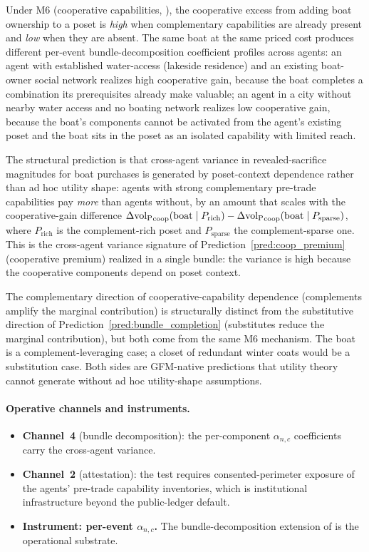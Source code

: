 Under M6 (cooperative capabilities,
\citep[Proposition~1]{lasser2026poset}), the cooperative excess
from adding boat ownership to a poset is \emph{high} when
complementary capabilities are already present and \emph{low}
when they are absent.  The same boat at the same priced cost
produces different per-event bundle-decomposition coefficient
profiles \citep[Definition~4]{lasser2026paper8a} across agents:
an agent with established water-access (lakeside residence) and
an existing boat-owner social network realizes high cooperative
gain, because the boat completes a combination its prerequisites
already make valuable; an agent in a city without nearby water
access and no boating network realizes low cooperative gain,
because the boat's components cannot be activated from the
agent's existing poset and the boat sits in the poset as an
isolated capability with limited reach.

The structural prediction is that cross-agent variance in
revealed-sacrifice magnitudes for boat purchases is generated by
poset-context dependence rather than ad hoc utility shape:
agents with strong complementary pre-trade capabilities pay
\emph{more} than agents without, by an amount that scales with
the cooperative-gain difference
$\Delta{\operatorname{vol}_{\mathrm{P}}}_{\mathrm{coop}}(\mathrm{boat} \mid P_{\mathrm{rich}})
- \Delta{\operatorname{vol}_{\mathrm{P}}}_{\mathrm{coop}}(\mathrm{boat} \mid
P_{\mathrm{sparse}})$, where $P_{\mathrm{rich}}$ is the
complement-rich poset and $P_{\mathrm{sparse}}$ the
complement-sparse one.  This is the cross-agent variance
signature of Prediction~\ref{pred:coop_premium} (cooperative
premium) realized in a single bundle: the variance is high
because the cooperative components depend on poset context.

The complementary direction of cooperative-capability
dependence (complements amplify the marginal contribution) is
structurally distinct from the substitutive direction of
Prediction~\ref{pred:bundle_completion} (substitutes reduce the
marginal contribution), but both come from the same M6
mechanism.  The boat is a complement-leveraging case; a closet
of redundant winter coats would be a substitution case.  Both
sides are GFM-native predictions that utility theory cannot
generate without ad hoc utility-shape assumptions.

\paragraph{Operative channels and instruments.}
\begin{itemize}
\item \textbf{Channel~4} (bundle decomposition): the
  per-component $\alpha_{n,c}$ coefficients carry the
  cross-agent variance.
\item \textbf{Channel~2} (attestation): the test requires
  consented-perimeter exposure of the agents' pre-trade
  capability inventories, which is institutional infrastructure
  beyond the public-ledger default.
\item \textbf{Instrument: per-event $\alpha_{n,c}$.}  The
  bundle-decomposition extension of
  \citep[Open~Question~2]{lasser2026paper8a} is the
  operational substrate.
\end{itemize}

